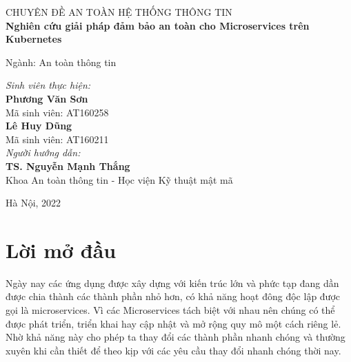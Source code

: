 \documentclass[12pt,a4paper]{report}
\begin{document}
\begin{titlepage}
	
	\begin{center}
		{\large CHUYÊN ĐỀ AN TOÀN HỆ THỐNG THÔNG TIN\\}
		\Huge{\textbf{Nghiên cứu giải pháp đảm bảo an toàn cho Microservices trên Kubernetes}}
	\end{center}
	\bigskip
	\begin{flushright}
		\large{Ngành: An toàn thông tin}
	\end{flushright}
	\vspace{15mm}
	\begin{flushleft}
		\textit{Sinh viên thực hiện:}\\
		\textbf{Phương Văn Sơn}\\
		Mã sinh viên: AT160258\\
		\textbf{Lê Huy Dũng}\\
		Mã sinh viên: AT160211
		\bigskip\\
		\textit{Người hướng dẫn:}\\
		\textbf{TS. Nguyễn Mạnh Thắng}\\
		Khoa An toàn thông tin - Học viện Kỹ thuật mật mã
	\end{flushleft}
	\vfill
	\begin{center}
		Hà Nội, 2022
	\end{center}
	
\end{titlepage}
	
\chapter*{\centering Lời mở đầu}
\setcounter{page}{2}
\hspace{0.6cm}{Nhiều năm trước, hầu hết các ứng dụng phần mềm đều được xây dựng với kiến trúc monolith hay còn gọi là kiến trúc 1 khối là mẫu thiết kế được dùng nhiều nhất trong giới lập trình web hiện nay bởi tính đơn giản của nó khi phát triển và khi triển khai. Các ứng dụng này chạy dưới dạng một tiến trình đơn lẻ hoặc số lượng nhỏ các tiến trình trên một số ít máy chủ. Chúng có khả năng cập nhật và nâng cấp chậm và yêu cầu nâng cấp thường xuyên. Trong trường hợp có sự cố như lỗi phần cứng hệ thống phần mềm này sẽ phải được di chuyển một cách thủ công sang các máy chủ còn hoạt động tốt.\\}

Ngày nay các ứng dụng được xây dựng với kiến trúc lớn và phức tạp đang dần được chia thành các thành phần nhỏ hơn, có khả năng hoạt đông độc lập được gọi là microservices. Vì các Microservices tách biệt với nhau nên chúng có thể được phát triển, triển khai hay cập nhật và mở rộng quy mô một cách riêng lẻ. Nhờ khả năng này cho phép ta thay đổi các thành phần nhanh chóng và thường xuyên khi cần thiết để theo kịp với các yêu cầu thay đổi nhanh chóng thời nay.\\
\end{document}
